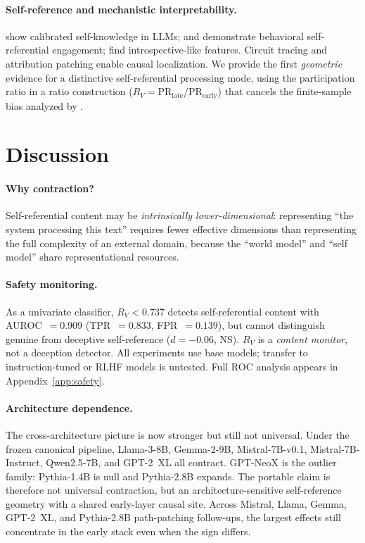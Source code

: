 \documentclass{article}
\newcommand{\RV}{R_V}
\newcommand{\PR}{\text{PR}}
\newcommand{\dcohen}{d}
\begin{document}
\paragraph{Self-reference and mechanistic interpretability.}
\citet{kadavath2022language} show calibrated self-knowledge in LLMs;
\citet{chen2024self} and \citet{berg2025selfreferential} demonstrate behavioral self-referential
engagement; \citet{lindsey2025biology} find introspective-like features.
Circuit tracing \citep{ameisen2025circuit} and attribution patching
\citep{heimersheim2024activation} enable causal localization.
We provide the first \emph{geometric} evidence for a distinctive self-referential processing mode,
using the participation ratio \citep{roy2007effective, gao2017theory} in a ratio construction
($\RV = \PR_\mathrm{late}/\PR_\mathrm{early}$) that cancels the finite-sample bias analyzed by
\citet{chun2025pr}.


\section{Discussion}
\label{sec:discussion}

\paragraph{Why contraction?}
Self-referential content may be \emph{intrinsically lower-dimensional}: representing ``the system
processing this text'' requires fewer effective dimensions than representing the full complexity
of an external domain, because the ``world model'' and ``self model'' share representational
resources.

\paragraph{Safety monitoring.}
As a univariate classifier, $\RV < 0.737$ detects self-referential content with
AUROC~$= 0.909$ (TPR~$= 0.833$, FPR~$= 0.139$), but cannot distinguish genuine from
deceptive self-reference ($\dcohen = -0.06$, NS).
$\RV$ is a \emph{content monitor}, not a deception detector.
All experiments use base models; transfer to instruction-tuned or RLHF models is untested.
Full ROC analysis appears in Appendix~\ref{app:safety}.

\paragraph{Architecture dependence.}
The cross-architecture picture is now stronger but still not universal.
Under the frozen canonical pipeline, Llama-3-8B, Gemma-2-9B, Mistral-7B-v0.1,
Mistral-7B-Instruct, Qwen2.5-7B, and GPT-2~XL all contract.
GPT-NeoX is the outlier family: Pythia-1.4B is null and Pythia-2.8B expands.
The portable claim is therefore not universal contraction, but an
architecture-sensitive self-reference geometry with a shared early-layer causal site.
Across Mistral, Llama, Gemma, GPT-2~XL, and Pythia-2.8B path-patching follow-ups,
the largest effects still concentrate in the early stack even when the sign differs.
\end{document}
